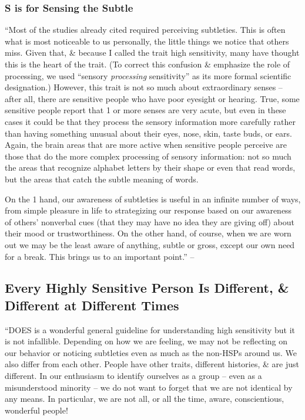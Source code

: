 \documentclass{article}
\numberwithin{equation}{section}
\begin{document}
\subsubsection*{S is for Sensing the Subtle}
``Most of the studies already cited required perceiving subtleties. This is often what is most noticeable to us personally, the little things we notice that others miss. Given that, \& because I called the trait high sensitivity, many have thought this is the heart of the trait. (To correct this confusion \& emphasize the role of processing, we used ``sensory \textit{processing} sensitivity'' as its more formal scientific designation.) However, this trait is not so much about extraordinary senses -- after all, there are sensitive people who have poor eyesight or hearing. True, some sensitive people report that 1 or more senses are very acute, but even in these cases it could be that they process the sensory information more carefully rather than having something unusual about their eyes, nose, skin, taste buds, or ears. Again, the brain areas that are more active when sensitive people perceive are those that do the more complex processing of sensory information: not so much the areas that recognize alphabet letters by their shape or even that read words, but the areas that catch the subtle meaning of words.

On the 1 hand, our awareness of subtleties is useful in an infinite number of ways, from simple pleasure in life to strategizing our response based on our awareness of others' nonverbal cues (that they may have no idea they are giving off) about their mood or trustworthiness. On the other hand, of course, when we are worn out we may be the least aware of anything, subtle or gross, except our own need for a break. This brings us to an important point.'' -- \cite[p. 23]{Aron2013}

\subsection*{Every Highly Sensitive Person Is Different, \& Different at Different Times}
``DOES is a wonderful general guideline for understanding high sensitivity but it is not infallible. Depending on how we are feeling, we may not be reflecting on our behavior or noticing subtleties even as much as the non-HSPs around us. We also differ from each other. People have other traits, different histories, \& are just different. In our enthusiasm to identify ourselves as a group -- even as a misunderstood minority -- we do not want to forget that we are not identical by any means. In particular, we are not all, or all the time, aware, conscientious, wonderful people!
\end{document}
